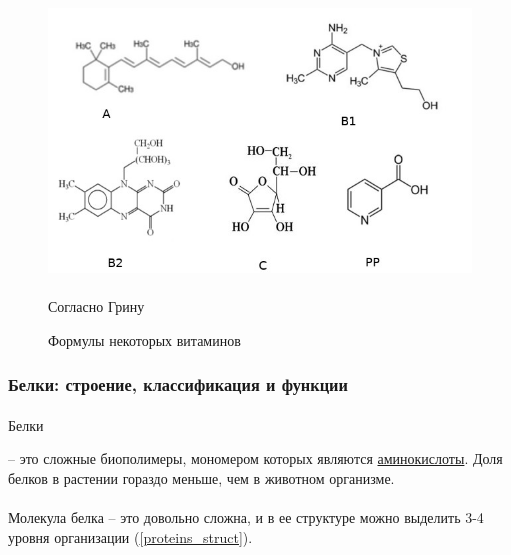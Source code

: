 \begin{figure}[h!]
  \centering
       \includegraphics[width=1\linewidth]{pictures/vitamins}
\caption{Формулы некоторых витаминов}
\paragraph*{}Согласно Грину \cite{green_bio}
\label{vitamins}
\end{figure}


\subsubsection*{Белки: строение, классификация и функции} 

\paragraph*{}\hypertarget{proteins}{Белки} -- это сложные биополимеры, мономером которых являются \hyperlink{aminoacids}{аминокислоты}. Доля белков в растении гораздо меньше, чем в животном организме.  

\paragraph*{}Молекула белка -- это довольно сложна, и в ее структуре можно выделить 3-4 уровня организации (\ris \ref{proteins_struct}).

